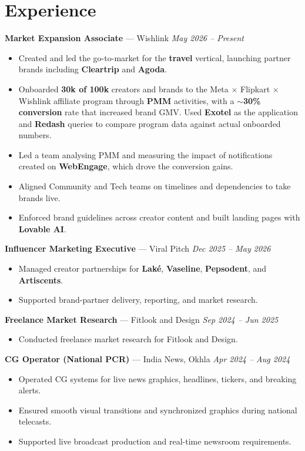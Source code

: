 \documentclass[10pt,a4paper]{article}
\newcommand{\role}[3]{%
  \vspace{5pt}%
  \textbf{#1} \textnormal{\textcolor{midgrey}{--- #2}}%
  \hfill\textcolor{midgrey}{\textit{#3}}%
  \vspace{1pt}%
}
\newcounter{tl}
\begin{document}
\section{Experience}

\role{Market Expansion Associate}{Wishlink}{May 2026 -- Present}
\begin{itemize}
  \item Created and led the go-to-market for the \textbf{travel} vertical, launching partner brands including \textbf{Cleartrip} and \textbf{Agoda}.
  \item Onboarded \textbf{30k of 100k} creators and brands to the Meta $\times$ Flipkart $\times$ Wishlink affiliate program through \textbf{PMM} activities, with a \textbf{$\sim$30\% conversion} rate that increased brand GMV. Used \textbf{Exotel} as the application and \textbf{Redash} queries to compare program data against actual onboarded numbers.
  \item Led a team analysing PMM and measuring the impact of notifications created on \textbf{WebEngage}, which drove the conversion gains.
  \item Aligned Community and Tech teams on timelines and dependencies to take brands live.
  \item Enforced brand guidelines across creator content and built landing pages with \textbf{Lovable AI}.
\end{itemize}

\role{Influencer Marketing Executive}{Viral Pitch}{Dec 2025 -- May 2026}
\begin{itemize}
  \item Managed creator partnerships for \textbf{Lak\'{e}}, \textbf{Vaseline}, \textbf{Pepsodent}, and \textbf{Artiscents}.
  \item Supported brand-partner delivery, reporting, and market research.
\end{itemize}

\role{Freelance Market Research}{Fitlook and Design}{Sep 2024 -- Jun 2025}
\begin{itemize}
  \item Conducted freelance market research for Fitlook and Design.
\end{itemize}

\role{CG Operator (National PCR)}{India News, Okhla}{Apr 2024 -- Aug 2024}
\begin{itemize}
  \item Operated CG systems for live news graphics, headlines, tickers, and breaking alerts.
  \item Ensured smooth visual transitions and synchronized graphics during national telecasts.
  \item Supported live broadcast production and real-time newsroom requirements.
\end{itemize}
\end{document}
